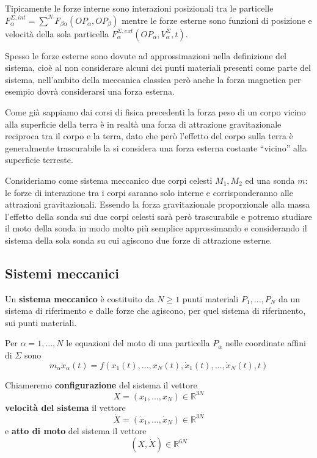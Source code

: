 \documentclass[11pt,a4paper,twoside]{book}
\newenvironment{esempio}[1][Esempio]{ 
  \begin{center}\begin{tcolorbox}[
  title={#1:\\},
  width=0.9\linewidth,
  flush right,
  enhanced jigsaw, 
  colback=white, 
  frame hidden, 
  sharpish corners, arc=3mm,
  borderline west = {1pt}{0pt}{gray},
  borderline south = {1pt}{0pt}{gray},
  coltitle=black, 
  fonttitle=\small\bfseries, 
  attach title to upper, 
  breakable,
  top=2.5pt, bottom=0.3pt]\small
  }{
 \normalsize \end{tcolorbox}\end{center}
}
\theoremstyle{esss}
\theoremstyle{dotless}
\numberwithin{equation}{section} %
\begin{document}
Tipicamente le forze interne sono interazioni posizionali tra le particelle $F_\alpha^{\Sigma,int}=\sum^N F_{\beta\alpha}(OP_\alpha,OP_\beta)$ mentre le forze esterne sono funzioni di posizione e velocità della sola particella $F_\alpha^{\Sigma,ext}(OP_\alpha,V_\alpha^\Sigma,t)$.

\clearpage
Spesso le forze esterne sono dovute ad approssimazioni nella definizione del sistema, cioè al non considerare alcuni dei punti materiali presenti come parte del sistema, nell'ambito della meccanica classica però anche la forza magnetica per esempio dovrà considerarsi una forza esterna.
\begin{esempio}[Forza peso e problema ristretto dei 3 corpi]
Come già sappiamo dai corsi di fisica precedenti la forza peso di un corpo vicino alla superficie della terra è in realtà una forza di attrazione gravitazionale reciproca tra il corpo e la terra, dato che però l'effetto del corpo sulla terra è generalmente trascurabile la si considera una forza esterna costante ``vicino'' alla superficie terreste.

Consideriamo come sistema meccanico due corpi celesti $M_1,M_2$ ed una sonda $m$: le forze di interazione tra i corpi saranno solo interne e corrisponderanno alle attrazioni gravitazionali. 
Essendo la forza gravitazionale proporzionale alla massa l'effetto della sonda sui due corpi celesti sarà però trascurabile e potremo studiare il moto della sonda in modo molto più semplice approssimando e considerando il sistema della sola sonda su cui agiscono due forze di attrazione esterne.
\end{esempio}

\subsection{Sistemi meccanici}\label{sezSistemiMeccanici}
Un \textbf{sistema meccanico} è costituito da $N\geq1$ punti materiali $P_1,...,P_N$ da un sistema di riferimento e dalle forze che agiscono, per quel sistema di riferimento, sui punti materiali.


Per $\alpha=1,...,N$ le equazioni del moto di una particella $P_\alpha$ nelle coordinate affini di $\Sigma$ sono
\begin{equation}\label{eqMotoPartSistemaCarte}
m_\alpha \ddot{x}_\alpha (t) = f(x_1(t),...,x_N(t),\dot{x}_1(t),...,\dot{x}_N(t),t)
\end{equation}


Chiameremo \textbf{configurazione} del sistema il vettore
\[
X=(x_1,...,x_N)\in\mathbb{R}^{3N}
\]
\textbf{velocità del sistema} il vettore
\[
\dot{X}=(\dot{x}_1,...,\dot{x}_N)\in\mathbb{R}^{3N}
\]
e \textbf{atto di moto} del sistema il vettore
\[
(X,\dot{X})\in\mathbb{R}^{6N}
\]
\end{document}
